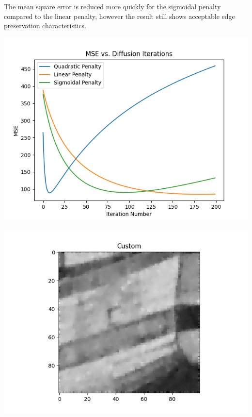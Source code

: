 \documentclass{article}
\begin{document}
  \noindent The mean square error is reduced more quickly for the sigmoidal penalty
  compared to the linear penalty, however the result still shows acceptable
  edge preservation characteristics.
  \begin{center}
    \includegraphics[scale=0.4]{../generated_images/MSE_test1.png}\\
  \end{center}
  \begin{center}
    \includegraphics[scale=0.5]{../generated_images/Custom_test1.png}\\
  \end{center}
\end{document}
